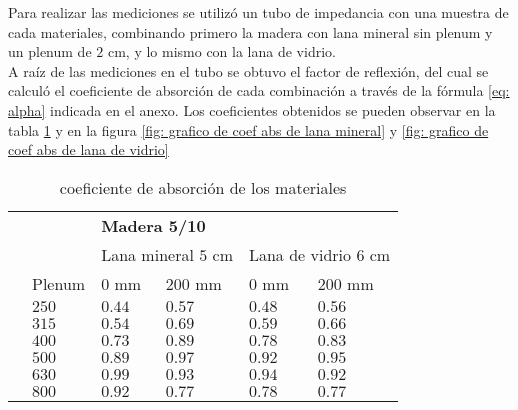 Para realizar las mediciones se utilizó un tubo de impedancia con una muestra de cada materiales, combinando primero la madera con lana mineral sin plenum y un plenum de $2$ cm, y lo mismo con la lana de vidrio.\\
A raíz de las mediciones en el tubo se obtuvo el factor de reflexión, del cual se calculó el coeficiente de absorción de cada combinación a través de la fórmula \ref{eq: alpha} indicada en el anexo. Los coeficientes obtenidos se pueden observar en la tabla \ref{tab: coef de abs medidos} y en la figura \ref{fig: grafico de coef abs de lana mineral} y \ref{fig: grafico de coef abs de lana de vidrio}
\begin{table}[H]
    \centering
    \caption{coeficiente de absorción de los materiales}
    \label{tab: coef de abs medidos}
    \begin{tabular}{ll|llll|}
    \cline{3-6}
     &  & \multicolumn{4}{l|}{\textbf{Madera 5/10}} \\ \cline{3-6} 
     &  & \multicolumn{2}{l|}{Lana mineral $5$ cm} & \multicolumn{2}{l|}{Lana de vidrio $6$ cm} \\ \cline{2-6} 
    \multicolumn{1}{l|}{} & Plenum & \multicolumn{1}{l|}{\cellcolor[HTML]{8784C7}$0$ mm} & \multicolumn{1}{l|}{\cellcolor[HTML]{AD84C6}$200$ mm} & \multicolumn{1}{l|}{\cellcolor[HTML]{5D739A}$0$ mm} & \cellcolor[HTML]{6997AF}$200$ mm \\ \hline
    \multicolumn{1}{|l|}{} & $250$ & \multicolumn{1}{l|}{$0.44$} & \multicolumn{1}{l|}{$0.57$} & \multicolumn{1}{l|}{$0.48$} & $0.56$ \\ \cline{2-6} 
    \multicolumn{1}{|l|}{} & $315$ & \multicolumn{1}{l|}{$0.54$} & \multicolumn{1}{l|}{$0.69$} & \multicolumn{1}{l|}{$0.59$} & $0.66$ \\ \cline{2-6} 
    \multicolumn{1}{|l|}{} & $400$ & \multicolumn{1}{l|}{$0.73$} & \multicolumn{1}{l|}{$0.89$} & \multicolumn{1}{l|}{$0.78$} & $0.83$ \\ \cline{2-6} 
    \multicolumn{1}{|l|}{} & $500$ & \multicolumn{1}{l|}{$0.89$} & \multicolumn{1}{l|}{$0.97$} & \multicolumn{1}{l|}{$0.92$} & $0.95$ \\ \cline{2-6} 
    \multicolumn{1}{|l|}{} & $630$ & \multicolumn{1}{l|}{$0.99$} & \multicolumn{1}{l|}{$0.93$} & \multicolumn{1}{l|}{$0.94$} & $0.92$ \\ \cline{2-6} 
    \multicolumn{1}{|l|}{} & $800$ & \multicolumn{1}{l|}{$0.92$} & \multicolumn{1}{l|}{$0.77$} & \multicolumn{1}{l|}{$0.78$} & $0.77$ \\ \cline{2-6} 

\end{tabular}
\end{table}
